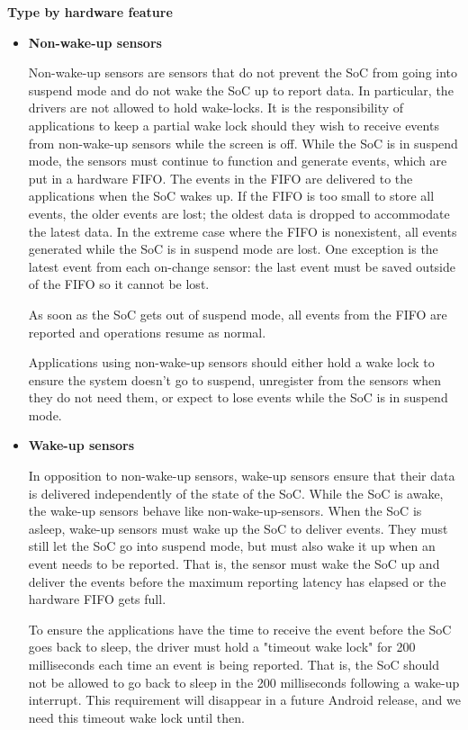 \textbf{Type by hardware feature}
\begin{itemize}
\item \textbf{Non-wake-up sensors}

  Non-wake-up sensors are sensors that do not prevent the SoC from going into
  suspend mode and do not wake the SoC up to report data. In particular, the
  drivers are not allowed to hold wake-locks. It is the responsibility of
  applications to keep a partial wake lock should they wish to receive events
  from non-wake-up sensors while the screen is off. While the SoC is in suspend
  mode, the sensors must continue to function and generate events, which are put
  in a hardware FIFO.
  The events in the FIFO are delivered to the applications when the SoC wakes
  up. If the FIFO is too small to store all events, the older events are lost;
  the oldest data is dropped to accommodate the latest data. In the extreme case
  where the FIFO is nonexistent, all events generated while the SoC is in
  suspend mode are lost. One exception is the latest event from each on-change
  sensor: the last event must be saved outside of the FIFO so it cannot be lost.

  As soon as the SoC gets out of suspend mode, all events from the FIFO are
  reported and operations resume as normal.

  Applications using non-wake-up sensors should either hold a wake lock to
  ensure the system doesn't go to suspend, unregister from the sensors when they
  do not need them, or expect to lose events while the SoC is in suspend mode.

\item \textbf{Wake-up sensors}

  In opposition to non-wake-up sensors, wake-up sensors ensure that their data
  is delivered independently of the state of the SoC. While the SoC is awake,
  the wake-up sensors behave like non-wake-up-sensors. When the SoC is asleep,
  wake-up sensors must wake up the SoC to deliver events. They must still let
  the SoC go into suspend mode, but must also wake it up when an event needs to
  be reported. That is, the sensor must wake the SoC up and deliver the events
  before the maximum reporting latency has elapsed or the hardware FIFO gets
  full. %

  To ensure the applications have the time to receive the event before the SoC
  goes back to sleep, the driver must hold a "timeout wake lock" for 200
  milliseconds each time an event is being reported. That is, the SoC should not
  be allowed to go back to sleep in the 200 milliseconds following a wake-up
  interrupt. This requirement will disappear in a future Android release, and we
  need this timeout wake lock until then.
\end{itemize}





